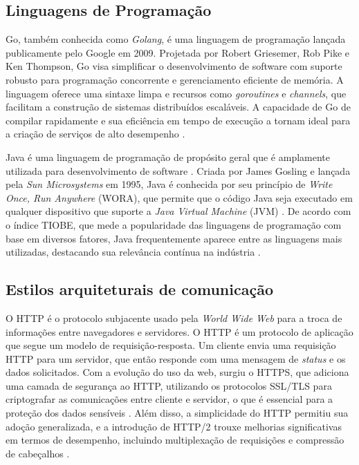 \subsection{Linguagens de Programação}
\label{sec:lp}
Go, também conhecida como \textit{Golang}, é uma linguagem de programação lançada publicamente pelo Google em 2009.
Projetada por Robert Griesemer, Rob Pike e Ken Thompson, Go visa simplificar o desenvolvimento de software com suporte robusto para programação concorrente e gerenciamento eficiente de memória.
A linguagem oferece uma sintaxe limpa e recursos como \textit{goroutines} e \textit{channels}, que facilitam a construção de sistemas distribuídos escaláveis.
A capacidade de Go de compilar rapidamente e sua eficiência em tempo de execução a tornam ideal para a criação de serviços de alto desempenho \cite{go2012} .

Java é uma linguagem de programação de propósito geral que é amplamente utilizada para desenvolvimento de software \cite{tiobe2024}.
Criada por James Gosling e lançada pela \textit{Sun Microsystems} em 1995, Java é conhecida por seu princípio de \textit{Write Once, Run Anywhere} (WORA), que permite que o código Java seja executado em qualquer dispositivo que suporte a \textit{Java Virtual Machine} (JVM) \cite{Singhal1998}.
De acordo com o índice TIOBE, que mede a popularidade das linguagens de programação com base em diversos fatores, Java frequentemente aparece entre as linguagens mais utilizadas, destacando sua relevância contínua na indústria \cite{tiobe2024}.

\subsection{Estilos arquiteturais de comunicação}
\label{sec:arqcomunicacao}
O HTTP é o protocolo subjacente usado pela \textit{World Wide Web} para a troca de informações entre navegadores e servidores.
O HTTP é um protocolo de aplicação que segue um modelo de requisição-resposta.
Um cliente envia uma requisição HTTP para um servidor, que então responde com uma mensagem de {\em status} e os dados solicitados.
Com a evolução do uso da web, surgiu o HTTPS, que adiciona uma camada de segurança ao HTTP, utilizando os protocolos SSL/TLS para criptografar as comunicações entre cliente e servidor, o que é essencial para a proteção dos dados sensíveis \cite{Asratian2023}.
Além disso, a simplicidade do HTTP permitiu sua adoção generalizada, e a introdução de HTTP/2 trouxe melhorias significativas em termos de desempenho, incluindo multiplexação de requisições e compressão de cabeçalhos \cite{rfc2616, rfc7540}.

